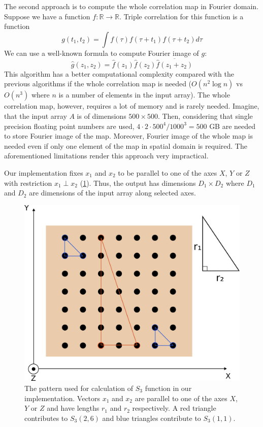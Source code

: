 \documentclass[1p]{elsarticle}
\begin{document}
The second approach is to compute the whole correlation map in Fourier
domain. Suppose we have a function
$f: \mathbb{R} \rightarrow \mathbb{R}$. Triple correlation for this function is
a function
\begin{equation}
  g(t_1, t_2) = \int f(\tau) f(\tau + t_1) f(\tau + t_2) d \tau
\end{equation}
We can use a well-known formula to compute Fourier image of $g$:
\begin{equation}
  \hat{g}(z_1, z_2) = \hat{f}(z_1) \hat{f}(z_2) \overline{\hat{f}(z_1 + z_2)}
\end{equation}
This algorithm has a better computational complexity compared with the previous
algorithms if the whole correlation map is needed ($O(n^2 \log n)$ vs
$O(n^3)$ where $n$ is a number of elements in the input array). The whole
correlation map, however, requires a lot of memory and is rarely
needed. Imagine, that the input array $A$ is of dimensions $500 \times 500$.
Then, considering that single precision floating point numbers are used,
$4 \cdot 2 \cdot 500^4 / 1000^3 = 500$ GB are needed to store Fourier image of
the map. Moreover, Fourier image of the whole map is needed even if only one
element of the map in spatial domain is required. The aforementioned limitations
render this approach very impractical.

Our implementation fixes $x_1$ and $x_2$ to be parallel to one of the axes $X$,
$Y$ or $Z$ with restriction $x_1 \perp x_2$ (\cref{fig:pattern}). Thus, the
output has dimensions $D_1 \times D_2$ where $D_1$ and $D_2$ are dimensions of
the input array along selected axes.
\begin{figure}[ht]
  \centering
  \includegraphics[width=0.5\linewidth]{images/pattern.png}
  \caption[]{The pattern used for calculation of $S_3$ function in our
    implementation. Vectors $x_1$ and $x_2$ are parallel to one of the axes $X$,
    $Y$ or $Z$ and have lengths $r_1$ and $r_2$ respectively. A red triangle
    contributes to $S_3(2, 6)$ and blue triangles contribute to $S_3(1, 1)$.}
  \label{fig:pattern}
\end{figure}
\end{document}
